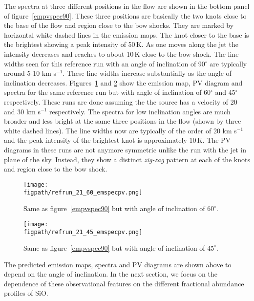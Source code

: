 \documentclass[useAMS,usenatbib,letters]{mn2e}
\newcommand{\figpath}{PFIGS/}
\begin{document}
The spectra at three different positions in the flow are shown in the
bottom panel of figure~\ref{empvspec90}. These three positions are
basically the two knots close to the base of the flow and region close
to the bow shocks. They are marked by horizontal white dashed lines in
the emission maps. The knot closer to the base is the brightest
showing a peak intensity of 50\,K. As one moves along the jet the
intensity decreases and reaches to about 10\,K close to the bow shock.
The line widths seen for this reference run with an angle of
inclination of 90$^{\circ}$ are typically around 5-10 km s$^{-1}$.
These line widths increase substantially as the angle of inclination
decreases. Figures~\ref{empvspec60} and \ref{empvspec45} show the
emission map, PV diagram and spectra for the same reference run but
with angle of inclination of 60$^{\circ}$ and 45$^{\circ}$
respectively. These runs are done assuming the the source has a
velocity of 20 and 30 km s$^{-1}$ respectively.
The spectra for low inclination angles are much broader
and less bright at the same three positions in the flow (shown by
three white dashed lines). The line 
widths now are typically of the order of 20 km s$^{-1}$ and the peak
intensity of the brightest knot is approximately 10\,K. 
The PV diagrams in these runs are not anymore symmetric unlike the run
with the jet in plane of the sky. Instead, they show a distinct {\it zig-zag}
pattern at each of the knots and region close to the bow shock.


\begin{figure}
 \texttt{[image: \\figpath/refrun\_21\_60\_emspecpv.png]}
 \caption{Same as figure~\ref{empvspec90} but with angle of
   inclination of $60^{\circ}$.} 
\label{empvspec60}
\end{figure}

\begin{figure}
 \texttt{[image: \\figpath/refrun\_21\_45\_emspecpv.png]}
 \caption{Same as figure~\ref{empvspec90} but with angle of
   inclination of $45^{\circ}$.} 
\label{empvspec45}
\end{figure}

%
The predicted emission maps, spectra and PV diagrams are shown above to depend
on the angle of inclination. In the next section, we focus on the
dependence of these observational features on the 
different fractional abundance profiles of SiO.
\end{document}
